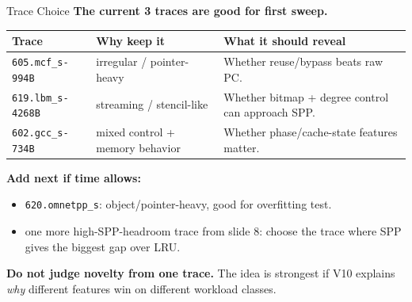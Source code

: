 \documentclass[10pt,aspectratio=169]{beamer}
\begin{document}
\begin{frame}{Trace Choice}
  \textbf{The current 3 traces are good for first sweep.}

  \vspace{0.3em}
  \begin{center}
  \footnotesize
  \begin{tabular}{lll}
    \toprule
    \textbf{Trace} & \textbf{Why keep it} & \textbf{What it should reveal} \\
    \midrule
    \texttt{605.mcf\_s-994B} & irregular / pointer-heavy & Whether reuse/bypass beats raw PC. \\
    \texttt{619.lbm\_s-4268B} & streaming / stencil-like & Whether bitmap + degree control can approach SPP. \\
    \texttt{602.gcc\_s-734B} & mixed control + memory behavior & Whether phase/cache-state features matter. \\
    \bottomrule
  \end{tabular}
  \end{center}

  \vspace{0.4em}
  \textbf{Add next if time allows:}
  \begin{itemize}
    \item \texttt{620.omnetpp\_s}: object/pointer-heavy, good for overfitting test.
    \item one more high-SPP-headroom trace from slide 8: choose the trace where SPP gives the biggest gap over LRU.
  \end{itemize}

  \vspace{0.3em}
  \textbf{Do not judge novelty from one trace.}
  The idea is strongest if V10 explains \emph{why} different features win on different workload classes.
\end{frame}
\end{document}
